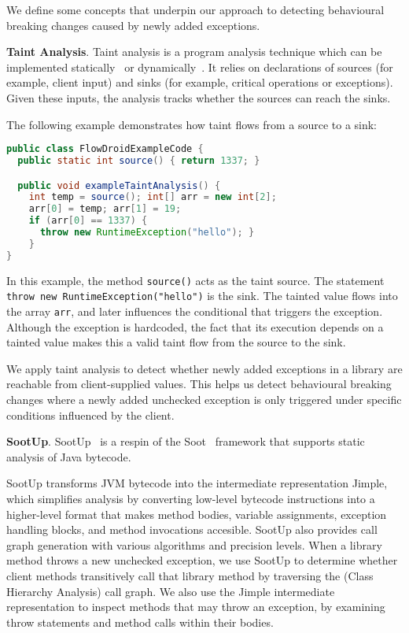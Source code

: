 We define some concepts that underpin our approach to detecting
behavioural breaking changes caused by newly added exceptions.

\textbf{Taint Analysis}. Taint analysis is a program analysis technique which can be implemented statically~\cite{myers99:_jflow} or dynamically~\cite{newsome05:_dynam}.
It relies on declarations of sources (for example, client input) and sinks (for example, critical
operations or exceptions). Given these inputs, the analysis tracks whether the sources can reach the sinks.

The following example demonstrates how taint flows from a source to a sink:

\begin{lstlisting}[language=java,basicstyle=\scriptsize\ttfamily]
public class FlowDroidExampleCode {
  public static int source() { return 1337; }

  public void exampleTaintAnalysis() {
    int temp = source(); int[] arr = new int[2];
    arr[0] = temp; arr[1] = 19;
    if (arr[0] == 1337) {
      throw new RuntimeException("hello"); }
    }
}
\end{lstlisting}

In this example, the method \texttt{source()} acts as the taint source. The statement \texttt{throw new RuntimeException("hello")} is the sink. The tainted value flows into the array \texttt{arr}, and later influences the conditional that triggers the exception. Although the exception is hardcoded, the fact that its execution depends on a tainted value makes this a valid taint flow from the source to the sink.

We apply taint analysis to detect whether newly added exceptions in a library are reachable from client-supplied values. This helps us detect behavioural breaking changes where a newly added unchecked exception is only triggered under specific conditions influenced by the client.

\textbf{SootUp}. SootUp~\cite{Karakaya24:_sootup} is a respin of the Soot~\cite{vallee2010soot} framework that supports static analysis of Java bytecode.

SootUp transforms JVM bytecode into the intermediate representation Jimple, which simplifies analysis by converting low-level bytecode instructions into a higher-level format that makes method bodies, variable assignments, exception handling blocks, and method invocations accesible. SootUp also provides call graph generation with various algorithms and precision levels. When a library method throws a new unchecked exception, we use SootUp to determine whether client methods transitively call that library method by traversing the (Class Hierarchy Analysis) call graph. We also use the Jimple intermediate representation to inspect methods that may throw an exception, by examining throw statements and method calls within their bodies.

